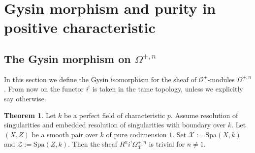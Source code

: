 \documentclass{amsart}
\def\Spa{\textrm{Spa}}
\theoremstyle{definition}
\newtheorem{theorem}{Theorem}[section]
\numberwithin{equation}{section}
\begin{document}
\section{Gysin morphism and purity in positive characteristic}
\subsection{The Gysin morphism on \texorpdfstring{$\Omega^{+,n}$}{Omega⁺}}
In this section we define the Gysin isomorphism for the sheaf of $\mathcal{O}^+$-modules $\Omega^{+,n}$. From now on the functor $i^!$ is taken in the tame topology, unless we explicitly say otherwise.
\begin{theorem}\label{Ri!IsConcentratedInDegree1}
	Let $k$ be a perfect field of characteristic $p$. Assume resolution of singularities and embedded resolution of singularities with boundary over $k$. Let $(X,Z)$ be a smooth pair over $k$ of pure codimension $1$. Set  $\mathcal{X}:=\Spa(X,k)$ and $\mathcal{Z}:=\Spa(Z,k)$. Then the sheaf $R^ni^!\Omega^{+,n}_{\mathcal{X}}$ is trivial for $n\neq 1$.
\end{theorem}
\end{document}
